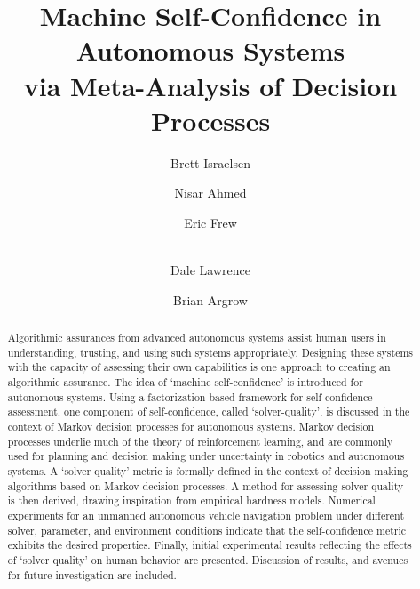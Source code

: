 \documentclass{llncs} %
\title{Machine Self-Confidence in Autonomous Systems \\ via  Meta-Analysis of Decision Processes}%
\author{Brett Israelsen\inst{1} \and
Nisar Ahmed \inst{1} \and
Eric Frew \inst{1} \and \\
Dale Lawrence \inst{1} \and
Brian Argrow \inst{1}
}
\institute{University of Colorado Boulder, Boulder CO 80309, USA
\email{brett.israelsen@colorado.edu; nisar.ahmed@colorado.edu}\\
\url{http://www.cohrint.info}}
\begin{document}
\maketitle
\begin{abstract}
    Algorithmic assurances from advanced autonomous systems assist human users in understanding, trusting, and using such systems appropriately. Designing these systems with the capacity of assessing their own capabilities is one approach to creating an algorithmic assurance. The idea of `machine self-confidence' is introduced for autonomous systems. Using a factorization based framework for self-confidence assessment, one component of self-confidence, called `solver-quality', is discussed in the context of Markov decision processes for autonomous systems. Markov decision processes underlie much of the theory of reinforcement learning, and are commonly used for planning and decision making under uncertainty in robotics and autonomous systems. A `solver quality' metric is formally defined in the context of decision making algorithms based on Markov decision processes. A method for assessing solver quality is then derived, drawing inspiration from empirical hardness models. Numerical experiments for an unmanned autonomous vehicle navigation problem under different solver, parameter, and environment conditions indicate that the self-confidence metric exhibits the desired properties. Finally, initial experimental results reflecting the effects of `solver quality' on human behavior are presented. Discussion of results, and avenues for future investigation are included.
\end{abstract}







\printbibliography
\end{document}
